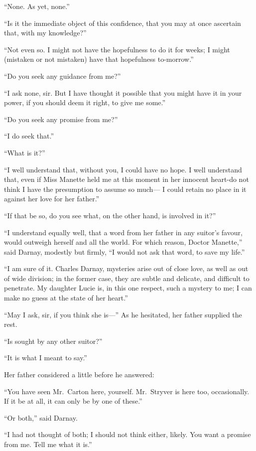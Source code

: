 ``None.  As yet, none.''

``Is it the immediate object of this confidence, that you may at once
ascertain that, with my knowledge?''

``Not even so.  I might not have the hopefulness to do it for weeks;
I might (mistaken or not mistaken) have that hopefulness to-morrow.''

``Do you seek any guidance from me?''

``I ask none, sir.  But I have thought it possible that you might have
it in your power, if you should deem it right, to give me some.''

``Do you seek any promise from me?''

``I do seek that.''

``What is it?''

``I well understand that, without you, I could have no hope.  I well
understand that, even if Miss Manette held me at this moment in her
innocent heart-do not think I have the presumption to assume so much---%
I could retain no place in it against her love for her father.''

``If that be so, do you see what, on the other hand, is involved in it?''

``I understand equally well, that a word from her father in any suitor's
favour, would outweigh herself and all the world.  For which reason,
Doctor Manette,'' said Darnay, modestly but firmly, ``I would not ask
that word, to save my life.''

``I am sure of it.  Charles Darnay, mysteries arise out of close love,
as well as out of wide division; in the former case, they are subtle
and delicate, and difficult to penetrate.  My daughter Lucie is, in
this one respect, such a mystery to me; I can make no guess at the
state of her heart.''

``May I ask, sir, if you think she is---'' As he hesitated, her father
supplied the rest.

``Is sought by any other suitor?''

``It is what I meant to say.''

Her father considered a little before he answered:

``You have seen Mr.\ Carton here, yourself.  Mr.\ Stryver is here too,
occasionally.  If it be at all, it can only be by one of these.''

``Or both,'' said Darnay.

``I had not thought of both; I should not think either, likely.
You want a promise from me.  Tell me what it is.''

